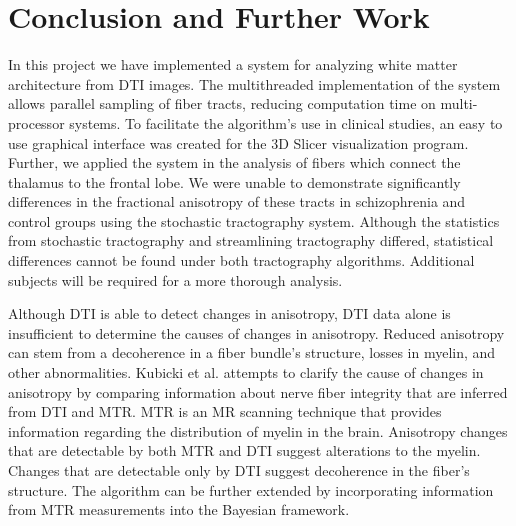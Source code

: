 \chapter{Conclusion and Further Work}
In this project we have implemented a system for analyzing white matter architecture from DTI images.  The multithreaded implementation of the system allows parallel sampling of fiber tracts, reducing computation time on multi-processor systems.  To facilitate the algorithm's use in clinical studies, an easy to use graphical interface was created for the 3D Slicer visualization program. Further, we applied the system in the analysis of fibers which connect the thalamus to the frontal lobe.  We were unable to demonstrate significantly differences in the fractional anisotropy of these tracts in schizophrenia and control groups using the stochastic tractography system.  Although the statistics from stochastic tractography and streamlining tractography differed, statistical differences cannot be found under both tractography algorithms.  Additional subjects will be required for a more thorough analysis.

Although DTI is able to detect changes in anisotropy, DTI data alone is insufficient to determine the causes of changes in anisotropy.  Reduced anisotropy can stem from a decoherence in a fiber bundle's structure, losses in myelin, and other abnormalities.  Kubicki et al. \cite{kubickiNI05} attempts to clarify the cause of changes in anisotropy by comparing information about nerve fiber integrity that are inferred from DTI and MTR.  MTR is an MR scanning technique that provides information regarding the distribution of myelin in the brain. Anisotropy changes that are detectable by both MTR and DTI suggest alterations to the myelin.  Changes that are detectable only by DTI suggest decoherence in the fiber's structure.  The algorithm can be further extended by incorporating information from MTR measurements \cite{kubickiNI05} into the Bayesian framework.



